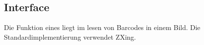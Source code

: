 \subsection{Interface }
Die Funktion eines  liegt im lesen von Barcodes in einem Bild.
Die Standardimplementierung  verwendet ZXing.

